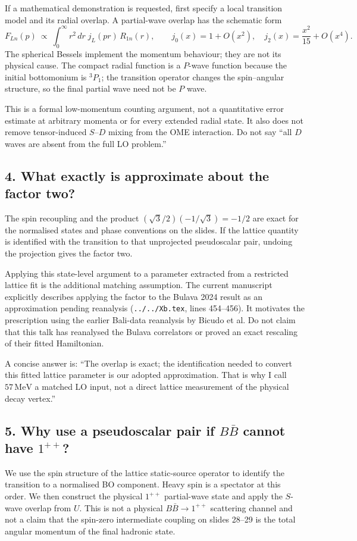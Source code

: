\documentclass[11pt,a4paper]{article}
\newcommand{\MeV}{\,\mathrm{MeV}}
\begin{document}
If a mathematical demonstration is requested, first specify a local
transition model and its radial overlap. A partial-wave overlap has the
schematic form
\[
 F_{Ln}(p)\ \propto\ \int_0^\infty r^2\,dr\;j_L(pr)\,R_{1n}(r),
 \qquad
 j_0(x)=1+O(x^2),\quad j_2(x)=\frac{x^2}{15}+O(x^4).
\]
The spherical Bessels implement the momentum behaviour; they are not its
physical cause. The compact radial function is a $P$-wave function because
the initial bottomonium is ${}^3P_1$; the transition operator changes the
spin--angular structure, so the final partial wave need not be $P$ wave.

This is a formal low-momentum counting argument, not a quantitative
error estimate at arbitrary momenta or for every extended radial state.
It also does not remove tensor-induced $S$--$D$ mixing from the OME
interaction. Do not say ``all $D$ waves are absent from the full LO problem.''

\subsection*{4. What exactly is approximate about the factor two?}
The spin recoupling and the product
$(\sqrt3/2)(-1/\sqrt3)=-1/2$ are exact for the normalised states and
phase conventions on the slides. If the lattice quantity is identified
with the transition to that unprojected pseudoscalar pair, undoing the
projection gives the factor two.

Applying this state-level argument to a parameter extracted from a
restricted lattice fit is the additional matching assumption. The
current manuscript explicitly describes applying the factor to the
Bulava 2024 result as an approximation pending reanalysis
(\texttt{../../Xb.tex}, lines 454--456). It motivates the prescription
using the earlier Bali-data reanalysis by Bicudo et al. Do not claim
that this talk has reanalysed the Bulava correlators or proved an exact
rescaling of their fitted Hamiltonian.

A concise answer is: ``The overlap is exact; the identification needed
to convert this fitted lattice parameter is our adopted approximation.
That is why I call $57\MeV$ a matched LO input, not a direct lattice
measurement of the physical decay vertex.''

\subsection*{5. Why use a pseudoscalar pair if $B\bar B$ cannot have $1^{++}$?}
We use the spin structure of the lattice static-source operator to
identify the transition to a normalised BO component. Heavy spin is a
spectator at this order. We then construct the physical $1^{++}$
partial-wave state and apply the $S$-wave overlap from $U$. This is not
a physical $B\bar B\to1^{++}$ scattering channel and not a claim
that the spin-zero intermediate coupling on slides 28--29 is the total
angular momentum of the final hadronic state.
\end{document}
